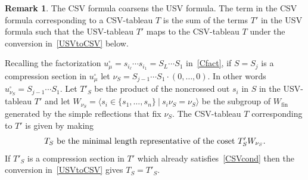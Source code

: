 \documentclass[11pt]{article}
\theoremstyle{plain}
\theoremstyle{definition}
\newtheorem{remark}[thm]{Remark}
\theoremstyle{remark}
\numberwithin{equation}{section}
\newcounter{r}
\newcounter{s}
\begin{document}
\begin{remark}
The CSV formula coarsens the USV formula.  The term in the CSV formula corresponding to a CSV-tableau $T$ is the
sum of the terms $T'$ in the USV formula such that the USV-tableau $T'$ maps to the CSV-tableau $T$ under the conversion in~\eqref{USVtoCSV} below. 

Recalling the factorization $u_\mu^\square = s_{i_\ell}\cdots s_{i_1} = S_L\cdots S_1$
in~\eqref{Cfact}, if $S=S_j$ is a compression section in $u_\mu^\square$ let $\nu_S = S_{j-1}\cdots S_1\cdot(0,\ldots,0)$.
In other words $u_{\nu_S}^\square = S_{j-1}\cdots S_1$.
Let $T'_S$ be the product of the noncrossed out $s_i$ in $S$ in the USV-tableau $T'$ and let
$W_{\nu_S} = \langle s_i\in \{s_1, \ldots, s_n\} \ |\ s_i\nu_S = \nu_S\rangle$ be the subgroup of $W_{\mathrm{fin}}$ generated by the simple reflections that fix $\nu_S$.  The CSV-tableau $T$ corresponding to $T'$ is given by making
\begin{equation}
\hbox{$T_S$ be the minimal length representative of the coset $T'_SW_{\nu_S}$.}
\label{USVtoCSV}
\end{equation}
If $T'_S$ is a compression section in $T'$ which already satisfies~\eqref{CSVcond} then the conversion in~\eqref{USVtoCSV} gives 
$T_S = T'_S$.


\end{remark}
\end{document}
